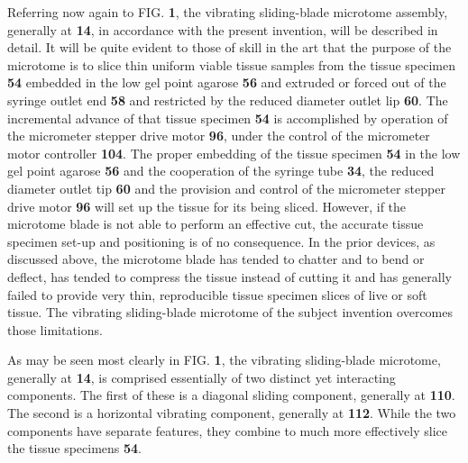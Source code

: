 \documentclass{article}
\begin{document}
Referring now again to FIG. \textbf{1}, the vibrating sliding-blade microtome assembly, generally at \textbf{14}, in accordance with the present invention, will be described in detail. It will be quite evident to those of skill in the art that the purpose of the microtome is to slice thin uniform viable tissue samples from the tissue specimen \textbf{54} embedded in the low gel point agarose \textbf{56} and extruded or forced out of the syringe outlet end \textbf{58} and restricted by the reduced diameter outlet lip \textbf{60}. The incremental advance of that tissue specimen \textbf{54} is accomplished by operation of the micrometer stepper drive motor \textbf{96}, under the control of the micrometer motor controller \textbf{104}. The proper embedding of the tissue specimen \textbf{54} in the low gel point agarose \textbf{56} and the cooperation of the syringe tube \textbf{34}, the reduced diameter outlet tip \textbf{60} and the provision and control of the micrometer stepper drive motor \textbf{96} will set up the tissue for its being sliced. However, if the microtome blade is not able to perform an effective cut, the accurate tissue specimen set-up and positioning is of no consequence. In the prior devices, as discussed above, the microtome blade has tended to chatter and to bend or deflect, has tended to compress the tissue instead of cutting it and has generally failed to provide very thin, reproducible tissue specimen slices of live or soft tissue. The vibrating sliding-blade microtome of the subject invention overcomes those limitations.

As may be seen most clearly in FIG. \textbf{1}, the vibrating sliding-blade microtome, generally at \textbf{14}, is comprised essentially of two distinct yet interacting components. The first of these is a diagonal sliding component, generally at \textbf{110}. The second is a horizontal vibrating component, generally at \textbf{112}. While the two components have separate features, they combine to much more effectively slice the tissue specimens \textbf{54}.
\end{document}
